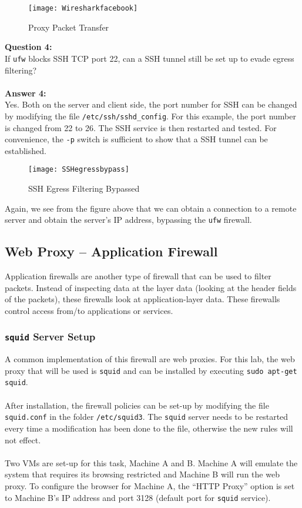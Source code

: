 \documentclass[a4paper,12pt]{article}
\begin{document}
\begin{figure}[H]
\centering
\texttt{[image: Wiresharkfacebook]}
\caption{Proxy Packet Transfer}
\label{fig:wiresharkfacebook}
\end{figure}

\noindent \textbf{Question 4:}\\
If \texttt{ufw} blocks SSH TCP port 22, can a SSH tunnel still be set up to evade egress filtering?\\
\\\textbf{Answer 4:}\\
Yes. Both on the server and client side, the port number for SSH can be changed by modifying the file \texttt{/etc/ssh/sshd\_config}. For this example, the port number is changed from 22 to 26. The SSH service is then restarted and tested. For convenience, the \texttt{-p} switch is sufficient to show that a SSH tunnel can be established.

\begin{figure}[H]
\centering
\texttt{[image: SSHegressbypass]}
\caption{SSH Egress Filtering Bypassed}
\label{fig:sshegressbypass}
\end{figure}

\noindent Again, we see from the figure above that we can obtain a connection to a remote server and obtain the server's IP address, bypassing the \texttt{ufw} firewall.
\subsection{Web Proxy -- Application Firewall}
Application firewalls are another type of firewall that can be used to filter packets. Instead of inspecting data at the layer data (looking at the header fields of the packets), these firewalls look at application-layer data. These firewalls control access from/to applications or services. 

\subsubsection{\texttt{squid} Server Setup}
A common implementation of this firewall are web proxies. For this lab, the web proxy that will be used is \texttt{squid} and can be installed by executing \texttt{sudo apt-get squid}.\\\\After installation, the firewall policies can be set-up by modifying the file \texttt{squid.conf} in the folder \texttt{/etc/squid3}. The \texttt{squid} server needs to be restarted every time a modification has been done to the file, otherwise the new rules will not effect.\\\\Two VMs are set-up for this task, Machine A and B. Machine A will emulate the system that requires its browsing restricted and Machine B will run the web proxy. To configure the browser for Machine A, the ``HTTP Proxy'' option is set to Machine B's IP address and port 3128 (default port for \texttt{squid} service).
\end{document}
